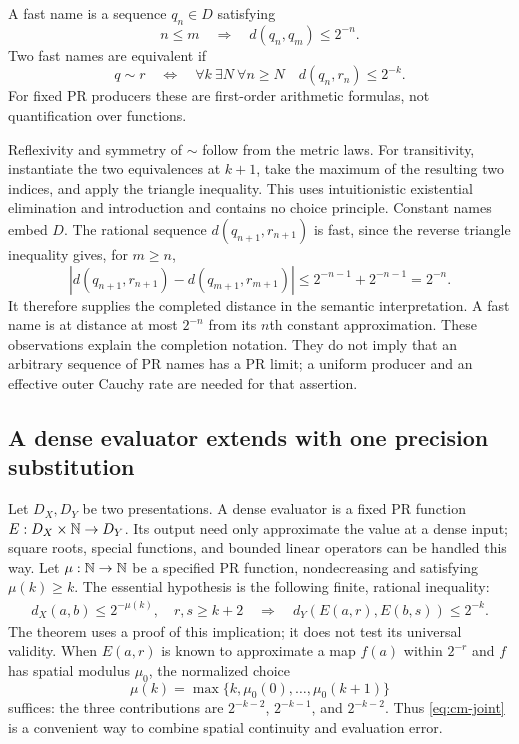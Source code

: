 \begin{definition}
\label{def:cm-fast}
A fast name is a sequence $q_n\in D$ satisfying
\[
             n\leq m\quad\Longrightarrow\quad d(q_n,q_m)\leq 2^{-n}.
\tag{C1}\label{eq:cm-fast}
\]
Two fast names are equivalent if
\[
 q\sim r\quad\Longleftrightarrow\quad
 \forall k\ \exists N\ \forall n\geq N\quad d(q_n,r_n)\leq 2^{-k}.
\tag{C2}\label{eq:cm-eq}
\]
For fixed PR producers these are first-order arithmetic formulas, not
quantification over functions.
\end{definition}

Reflexivity and symmetry of $\sim$ follow from the metric laws.  For
transitivity, instantiate the two equivalences at $k+1$, take the maximum of
the resulting two indices, and apply the triangle inequality.  This uses
intuitionistic existential elimination and introduction and contains no choice
principle.  Constant names embed $D$.  The rational sequence
$d(q_{n+1},r_{n+1})$ is fast, since the reverse triangle inequality gives, for
$m\geq n$,
\[
 |d(q_{n+1},r_{n+1})-d(q_{m+1},r_{m+1})|
 \leq 2^{-n-1}+2^{-n-1}=2^{-n}.
\]
It therefore supplies the completed distance in the semantic interpretation.
A fast name is at distance at most $2^{-n}$ from its $n$th constant
approximation.  These observations explain the completion notation.  They do
not imply that an arbitrary sequence of PR names has a PR limit; a uniform
producer and an effective outer Cauchy rate are needed for that assertion.

\subsection{A dense evaluator extends with one precision substitution}

Let $D_X,D_Y$ be two presentations.  A dense evaluator is a fixed PR function
$E:D_X\times\mathbb N\to D_Y$.  Its output need only approximate the value at a dense
input; square roots, special functions, and bounded linear operators can be
handled this way.  Let $\mu:\mathbb N\to\mathbb N$ be a specified PR function, nondecreasing
and satisfying $\mu(k)\geq k$.  The essential hypothesis is the following
finite, rational inequality:
\[
\begin{split}
 d_X(a,b)\leq 2^{-\mu(k)},\quad r,s\geq k+2
 \quad\Longrightarrow\quad
 d_Y(E(a,r),E(b,s))\leq2^{-k}.
\end{split}
\tag{C3}\label{eq:cm-joint}
\]
The theorem uses a proof of this implication; it does not test its universal
validity.  When $E(a,r)$ is known to approximate a map $f(a)$ within $2^{-r}$
and $f$ has spatial modulus $\mu_0$, the normalized choice
\[
     \mu(k)=\max\{k,\mu_0(0),\ldots,\mu_0(k+1)\}
\]
suffices: the three contributions are $2^{-k-2}$, $2^{-k-1}$,
and $2^{-k-2}$.  Thus \eqref{eq:cm-joint} is a convenient way to combine
spatial continuity and evaluation error.

